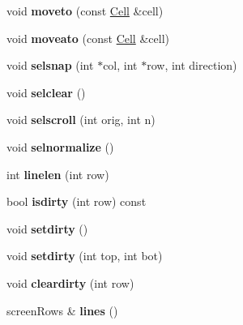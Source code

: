 \begin{DoxyCompactItemize}
void {\bfseries moveto} (const \mbox{\hyperlink{structCell}{Cell}} \&cell)
\item 
\mbox{\label{classscreen_1_1Screen_a1f4172af646fe41717b3f1378b98f217}} 
void {\bfseries moveato} (const \mbox{\hyperlink{structCell}{Cell}} \&cell)
\item 
\mbox{\label{classscreen_1_1Screen_a0443cf0820905ef190d1576be310c7f8}} 
void {\bfseries selsnap} (int $\ast$col, int $\ast$row, int direction)
\item 
\mbox{\label{classscreen_1_1Screen_a1db646d6926841353b402bf69e37e1f5}} 
void {\bfseries selclear} ()
\item 
\mbox{\label{classscreen_1_1Screen_aed6e6c23e447c3f2c406762ea1f0e233}} 
void {\bfseries selscroll} (int orig, int n)
\item 
\mbox{\label{classscreen_1_1Screen_a3e1f933f12679e6a8b936bad287c9759}} 
void {\bfseries selnormalize} ()
\item 
\mbox{\label{classscreen_1_1Screen_aecbf2299a867a36cda85c2bd8ca654b2}} 
int {\bfseries linelen} (int row)
\item 
\mbox{\label{classscreen_1_1Screen_a563974d34fa783b5f36ad60236ecb824}} 
bool {\bfseries isdirty} (int row) const
\item 
\mbox{\label{classscreen_1_1Screen_a927b8b19296c94608fd5a811e9ad63b3}} 
void {\bfseries setdirty} ()
\item 
\mbox{\label{classscreen_1_1Screen_aa0820a386cf1bfed81f24dfd1ff2e3ad}} 
void {\bfseries setdirty} (int top, int bot)
\item 
\mbox{\label{classscreen_1_1Screen_a28c8a75ee292f5995f1cd3700417a28d}} 
void {\bfseries cleardirty} (int row)
\item 
\mbox{\label{classscreen_1_1Screen_af93a3457f18fa5f5558ca40ca0813baa}} 
screen\+Rows \& {\bfseries lines} ()

\end{DoxyCompactItemize}
